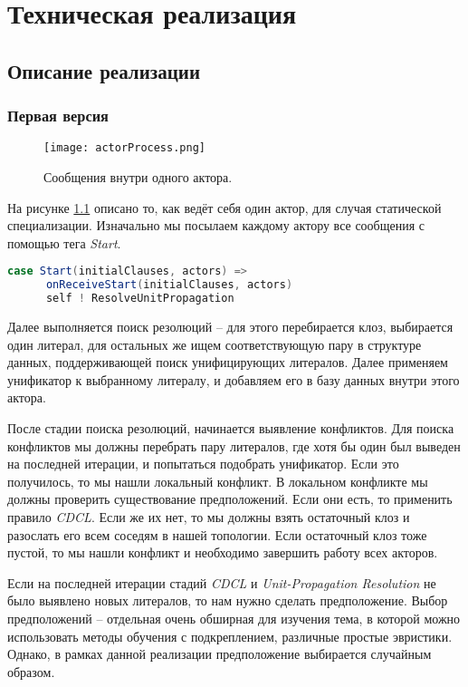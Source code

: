\chapter{Техническая реализация}
\label{sec:chap3}

\section{Описание реализации}

\subsection{Первая версия}

\begin{figure}[!h]
\centering
\texttt{[image: actorProcess.png]}
\caption{Сообщения внутри одного актора.}\label{fig:actorProcess}
\end{figure}

На рисунке \ref{fig:actorProcess} описано то, как ведёт себя один актор, для случая статической специализации.
Изначально мы посылаем каждому актору все сообщения с помощью тега \emph{Start}.
\begin{lstlisting}[language=scala]
    case Start(initialClauses, actors) =>
      onReceiveStart(initialClauses, actors)
      self ! ResolveUnitPropagation
\end{lstlisting}

Далее выполняется поиск резолюций -- для этого перебирается клоз, выбирается один литерал, для остальных же ищем соответствующую пару в структуре данных, поддерживающей поиск унифицирующих литералов. Далее применяем унификатор к выбранному литералу, и добавляем его в базу данных внутри этого актора.

После стадии поиска резолюций, начинается выявление конфликтов. Для поиска конфликтов мы должны перебрать пару литералов, где хотя бы один был выведен на последней итерации, и попытаться подобрать унификатор. Если это получилось, то мы нашли локальный конфликт. В локальном конфликте мы должны проверить существование предположений. Если они есть, то применить правило \emph{CDCL}. Если же их нет, то мы должны взять остаточный клоз и разослать его всем соседям в нашей топологии. Если остаточный клоз тоже пустой, то мы нашли конфликт и необходимо завершить работу всех акторов.

Если на последней итерации стадий \emph{CDCL} и \emph{Unit-Propagation Resolution} не было выявлено новых литералов, то нам нужно сделать предположение. Выбор предположений -- отдельная очень обширная для изучения тема, в которой можно использовать методы обучения с подкреплением, различные простые эвристики. Однако, в рамках данной реализации предположение выбирается случайным образом.

